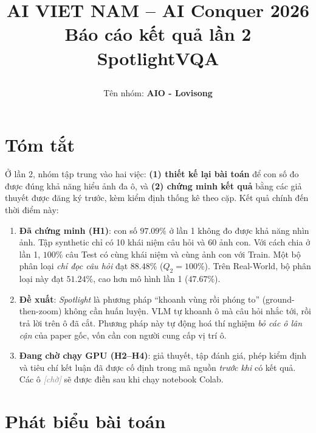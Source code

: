 \documentclass[12pt]{ai_conquer2026}
\title{%
  \begin{center}
        \Large {AI VIET NAM -- AI Conquer 2026}\\[.5ex]
        \Huge \textbf{Báo cáo kết quả lần 2}\\[.5ex]
        \Large \textbf{SpotlightVQA}\\[.5ex]
  \end{center}
}
\author{
\begin{minipage}{\textwidth}
\centering
{
\vspace{-1.5em}
Tên nhóm: \textbf{AIO - Lovisong}\\[0.5em]}
\end{minipage}
}
\date{}
\newcommand{\fillin}[1]{\textcolor{gray}{\textit{[#1]}}}
\newcommand{\tbd}{\fillin{chờ}}
\begin{document}
\maketitle
\vspace{-5.5em}

\vspace{1em}

\section{Tóm tắt}

Ở lần 2, nhóm tập trung vào hai việc: \textbf{(1) thiết kế lại bài toán} để con số đo được đúng khả năng hiểu ảnh đa ô, và \textbf{(2) chứng minh kết quả} bằng các giả thuyết được đăng ký trước, kèm kiểm định thống kê theo cặp. Kết quả chính đến thời điểm này:

\begin{enumerate}
    \item \textbf{Đã chứng minh (H1)}: con số $97.09\%$ ở lần 1 không đo được khả năng nhìn ảnh. Tập synthetic chỉ có 10 khái niệm câu hỏi và 60 ảnh con. Với cách chia ở lần 1, $100\%$ câu Test có cùng khái niệm và cùng ảnh con với Train. Một bộ phân loại \emph{chỉ đọc câu hỏi} đạt $88.48\%$ ($Q_2 = 100\%$). Trên Real-World, bộ phân loại này đạt $51.24\%$, cao hơn mô hình lần 1 ($47.67\%$).
    \item \textbf{Đề xuất}: \emph{Spotlight} là phương pháp ``khoanh vùng rồi phóng to'' (ground-then-zoom) không cần huấn luyện. VLM tự khoanh ô mà câu hỏi nhắc tới, rồi trả lời trên ô đã cắt. Phương pháp này tự động hoá thí nghiệm \emph{bỏ các ô lân cận} của paper gốc, vốn cần con người cung cấp vị trí ô.
    \item \textbf{Đang chờ chạy GPU (H2--H4)}: giả thuyết, tập đánh giá, phép kiểm định và tiêu chí kết luận đã được cố định trong mã nguồn \emph{trước khi} có kết quả. Các ô \tbd{} sẽ được điền sau khi chạy notebook Colab.
\end{enumerate}

\section{Phát biểu bài toán}
\label{sec:problem}
\end{document}
